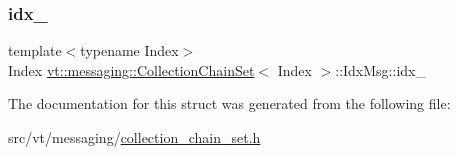 \subsubsection{\texorpdfstring{idx\+\_\+}{idx\_}}
{\footnotesize\ttfamily template$<$typename Index$>$ \\
Index \hyperlink{classvt_1_1messaging_1_1_collection_chain_set}{vt\+::messaging\+::\+Collection\+Chain\+Set}$<$ Index $>$\+::Idx\+Msg\+::idx\+\_\+}



The documentation for this struct was generated from the following file\+:\begin{DoxyCompactItemize}
\item 
src/vt/messaging/\hyperlink{collection__chain__set_8h}{collection\+\_\+chain\+\_\+set.\+h}\end{DoxyCompactItemize}
